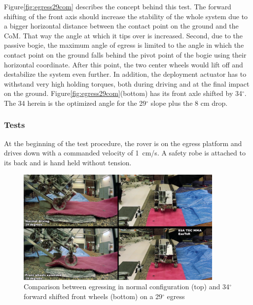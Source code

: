 \documentclass[a4paper,twocolumn]{esapub2005} %
\begin{document}
Figure\ref{fig:egress29com} describes the concept behind this test. The
forward shifting of the front axis should increase the stability of the
whole system due to a bigger horizontal distance between the contact point
on the ground and the CoM. That way the angle at which it tips over is
increased. Second, due to the passive bogie, the maximum angle of egress is
limited to the angle in which the contact point on the ground falls behind
the pivot point of the bogie using their horizontal coordinate. After this
point, the two center wheels would lift off and destabilize the system even
further. In addition, the deployment actuator has to withstand very high
holding torques, both during driving and at the final impact on the ground.
Figure\ref{fig:egress29com}(bottom) has its front axle shifted by
34$^\circ$. The 34 herein is the optimized angle for the 29$^\circ$ slope
plus the 8 cm drop. 



\subsubsection{Tests}

At the beginning of the test procedure, the rover is on the egress platform and
drives down with a commanded velocity of 1~\unit{cm/s}. A safety robe is
attached to its back and is hand held without tension. 

\begin{figure}[h!] \centering
    \includegraphics[width=0.9\textwidth]{egress29.png}	\caption{Comparison
    between egressing in normal configuration (top) and 34$^{\circ}$ forward
    shifted front wheels (bottom) on a 29$^{\circ}$ egress} \label{fig:egress29}
\end{figure}
\end{document}
